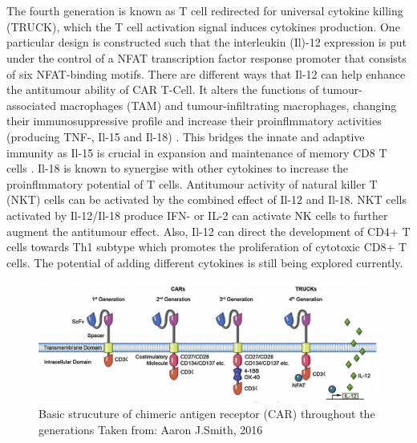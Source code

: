 \documentclass[12pt,oneside]{report}
\begin{document}
\\\\The fourth generation is known as T cell redirected for universal cytokine killing (TRUCK), which the T cell activation signal induces cytokines production. One particular design is constructed such that the interleukin (Il)-12 expression is put under the control of a NFAT transcription factor response promoter that consists of six NFAT-binding motifs\citep{il12, il122}. There are different ways that Il-12 can help enhance the antitumour ability of CAR T-Cell. It alters the functions of tumour-associated macrophages (TAM) and tumour-infiltrating macrophages, changing their immunosuppressive profile and increase their proinflmmatory activities (producing TNF-\textalpha, Il-15 and Il-18) \citep{il12macro}. This bridges the innate and adaptive immunity as Il-15 is crucial in expansion and maintenance of memory CD8 T cells \citep{il15cd}. Il-18 is known to synergise with other cytokines to increase the proinflmmatory potential of T cells\citep{il18}. Antitumour activity of natural killer T (NKT) cells can be activated by the combined effect of Il-12 and Il-18\citep{NKT}. NKT cells activated by Il-12/Il-18 produce IFN-\textgamma{} or IL-2 can activate NK cells to further augment the antitumour effect\citep{NKT}. Also, Il-12 can direct the development of CD4+ T cells towards Th1 subtype \citep{cd4il12, cd4il122, cd4il123, cd4il124} which promotes the proliferation of cytotoxic CD8+ T cells. The potential of adding different cytokines is still being explored currently.

\begin{figure}[h!]
  \includegraphics[scale=0.5]{generation.png}
  \caption{Basic strucuture of chimeric antigen receptor (CAR) throughout the generations Taken from: Aaron J.Smith, 2016\citep{fig1}}
\end{figure}
\end{document}

